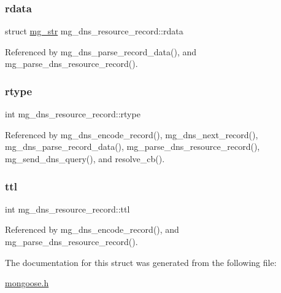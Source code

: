 \mbox{\label{structmg__dns__resource__record_ac169801d0c9ce94137fcce9a3f629152_ac169801d0c9ce94137fcce9a3f629152}} 
\subsubsection{\texorpdfstring{rdata}{rdata}}
{\footnotesize\ttfamily struct \hyperlink{structmg__str}{mg\+\_\+str} mg\+\_\+dns\+\_\+resource\+\_\+record\+::rdata}



Referenced by mg\+\_\+dns\+\_\+parse\+\_\+record\+\_\+data(), and mg\+\_\+parse\+\_\+dns\+\_\+resource\+\_\+record().

\mbox{\label{structmg__dns__resource__record_a9d314632522fcca513858285c639bee9_a9d314632522fcca513858285c639bee9}} 
\subsubsection{\texorpdfstring{rtype}{rtype}}
{\footnotesize\ttfamily int mg\+\_\+dns\+\_\+resource\+\_\+record\+::rtype}



Referenced by mg\+\_\+dns\+\_\+encode\+\_\+record(), mg\+\_\+dns\+\_\+next\+\_\+record(), mg\+\_\+dns\+\_\+parse\+\_\+record\+\_\+data(), mg\+\_\+parse\+\_\+dns\+\_\+resource\+\_\+record(), mg\+\_\+send\+\_\+dns\+\_\+query(), and resolve\+\_\+cb().

\mbox{\label{structmg__dns__resource__record_aa5d1c1a7ba2d02908c27fab68ded25be_aa5d1c1a7ba2d02908c27fab68ded25be}} 
\subsubsection{\texorpdfstring{ttl}{ttl}}
{\footnotesize\ttfamily int mg\+\_\+dns\+\_\+resource\+\_\+record\+::ttl}



Referenced by mg\+\_\+dns\+\_\+encode\+\_\+record(), and mg\+\_\+parse\+\_\+dns\+\_\+resource\+\_\+record().



The documentation for this struct was generated from the following file\+:\begin{DoxyCompactItemize}
\item 
\hyperlink{mongoose_8h}{mongoose.\+h}\end{DoxyCompactItemize}

